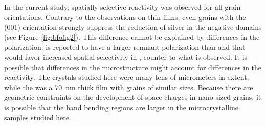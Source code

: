In the current study, spatially selective reactivity was observed for all grain
orientations. Contrary to the observations on  thin films, even grains with the
(001) orientation strongly suppress the reduction of silver in the negative domains (see
Figure \ref{fig:bfofig2}). This difference cannot be explained by differences in the
polarization:  is reported to have a larger remnant polarization than
 and that would favor increased spatial selectivity in , counter to
what is observed.\cite{Kobayashi:2005wx} It is possible that differences in the
microstructure might account for differences in the reactivity. The  crystals
studied here were many tens of micrometers in extent, while the  was a
\SI{70}{\nano\meter} thick film with grains of similar sizes.\cite{Dunn:2007cx} Because
there are geometric constraints on the development of space charges in nano-sized grains,
it is possible that the band bending regions are larger in the microcrystalline
 samples studied here.\cite{ALBERY:1984tu}

